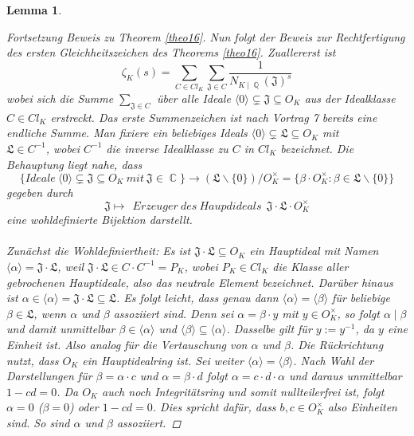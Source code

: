 \documentclass[10pt,a4paper]{article}
\theoremstyle{plain}
\newtheorem{lem}[thm]{Lemma}
\theoremstyle{definition}
\theoremstyle{remark}
\DeclareMathOperator{\C}{\mathbb{C}}
\DeclareMathOperator{\Q}{\mathbb{Q}}
\begin{document}
\begin{lem}
\begin{proof}[Fortsetzung Beweis zu Theorem \ref{theo16}]
Nun folgt der Beweis zur Rechtfertigung des ersten Gleichheitszeichen des Theorems \ref{theo16}. Zuallererst ist $$\zeta_K(s) = \sum_{C \in Cl_K}\sum_{\mathfrak{J} \in C}\frac{1}{N_{K\mid \Q}(\mathfrak{J})^s}$$wobei sich die Summe $\sum_{\mathfrak{J} \in C}$ über alle Ideale $\langle 0 \rangle \subsetneq \mathfrak{J} \subseteq O_K$ aus der Idealklasse $C \in Cl_K$ erstreckt. Das erste Summenzeichen ist nach Vortrag 7 bereits eine endliche Summe. Man fixiere ein beliebiges Ideals $\langle 0 \rangle \subsetneq \mathfrak{L} \subseteq O_K$ mit \\$\mathfrak{L}\in C^{-1}$, wobei $C^{-1}$ die inverse Idealklasse zu $C$ in $Cl_K$ bezeichnet. Die Behauptung liegt nahe, dass  $$\{Ideale \ \langle 0 \rangle \subsetneq \mathfrak{J} \subseteq O_K \ mit \ \mathfrak{J} \in \C\}\rightarrow(\mathfrak{L}\backslash\{0\})/O_K^{\times}=\{ \beta \cdot O_K^{\times} \colon \beta \in \mathfrak{L}\backslash\{ 0\}\}$$ gegeben durch $$\mathfrak{J}\mapsto \ \ Erzeuger\ des\ Haupdideals \ \ \mathfrak{J\cdot L}\cdot O_K^{\times}$$ eine wohldefinierte Bijektion darstellt. \\
\\
Zunächst die Wohldefiniertheit:
Es ist $\mathfrak{J\cdot L}\subseteq O_K$ ein Hauptideal mit Namen $\langle \alpha \rangle=\mathfrak{J\cdot L}$, weil $\mathfrak{J\cdot L} \in C\cdot C^{-1} = P_K$, wobei $P_K \in Cl_K$ die Klasse aller gebrochenen Hauptideale, also das neutrale Element bezeichnet. Darüber hinaus ist $\alpha \in \langle \alpha \rangle=\mathfrak{J\cdot L}\subseteq \mathfrak{L}$. Es folgt leicht, dass genau dann $\langle \alpha \rangle=\langle \beta \rangle$ für beliebige $\beta \in \mathfrak{L}$, wenn $\alpha$ und $\beta$ assoziiert sind. Denn sei $\alpha=\beta \cdot y$ mit $y \in O_K^{\times}$, so folgt $\alpha \mid \beta$ und damit unmittelbar $\beta \in \langle \alpha \rangle$ und $\langle \beta \rangle  \subseteq \langle \alpha \rangle$. Dasselbe gilt für $y:= y^{-1}$, da $y$ eine Einheit ist. Also analog für die Vertauschung von $\alpha$ und $\beta$. Die Rückrichtung nutzt, dass $O_K$ ein Hauptidealring ist. Sei weiter $\langle \alpha \rangle=\langle \beta \rangle$. Nach Wahl der Darstellungen für $\beta=\alpha\cdot c$ und $\alpha=\beta\cdot d$ folgt $\alpha=c\cdot d \cdot \alpha$ und daraus unmittelbar $1-cd=0$. Da $O_K$ auch noch Integritätsring und somit nullteilerfrei ist, folgt $\alpha=0$  ($\beta =0$) oder $1-cd=0$. Dies spricht dafür, dass $b,c \in O_K^{\times}$ also Einheiten sind. So sind $\alpha$ und $\beta$ assoziiert.

\end{proof}
\end{lem}
\end{document}

